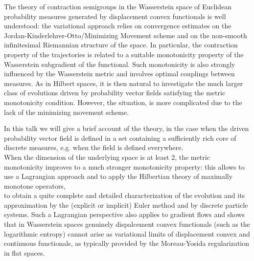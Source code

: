 \mypage
{}
\begin{myabstract}
The theory of contraction semigroups in the Wasserstein space of Euclidean probability measures generated by displacement convex functionals is well understood: the variational approach relies on convergence estimates on the Jordan-Kinderlehrer-Otto/Minimizing Movement scheme and on the non-smooth infinitesimal Riemannian structure of the space. In particular, the contraction property of the trajectories is related to a suitable monotonicity property of the Wasserstein subgradient of the functional. Such monotonicity is also strongly influenced by the Wasserstein metric and involves optimal couplings between measures.
As in Hilbert spaces, it is then natural to investigate the much larger class of evolutions driven by probability vector fields satisfying the metric monotonicity condition. However, the situation, is more complicated due to the lack of the minimizing movement scheme.

In this talk we will give a brief account of the theory, in the case when the driven probability vector field is defined in a set containing a sufficiently rich core of discrete measures, e.g. when the field is defined everywhere.\\\relax
When the dimension of the underlying space is at least 2, the metric monotonicity improves to a much stronger monotonicity property: this allows to use a Lagrangian approach and to apply the Hilbertian theory of maximally monotone operators,\\\relax
to obtain a quite complete and detailed characterization of the evolution and its approximation by the (explicit or implicit) Euler method and by discrete particle systems. Such a Lagrangian perspective also applies to gradient flows and shows that in Wasserstein spaces genuinely dispalcement convex functionals (such as the logarithmic entropy) cannot arise as variational limits of displacement convex and continuous functionals, as typically provided by the Moreau-Yosida regularization in flat spaces.
\end{myabstract}

